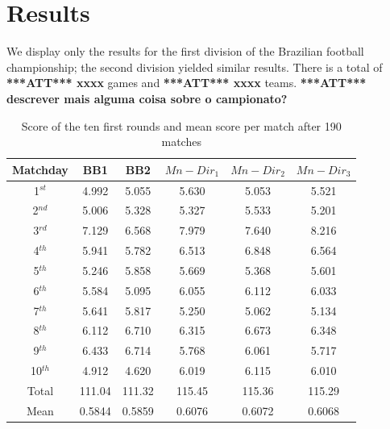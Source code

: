 \documentclass[journal,article,accept,moreauthors,pdftex,12pt,a4paper]{mdpi}
\newcommand{\red}[1]{\textbf{\color{red} ***ATT*** #1}}
\begin{document}
\section{Results}
\label{sec::results}

We display only the results for the first division
of the Brazilian football championship; the second
division yielded similar results.
There is a total of \red{xxxx} games and \red{xxxx}
teams. \red{descrever mais alguma coisa sobre o campionato?}

\begin{table}[H]
\begin{center}
\begin{tabular}{cccccc}

\hline
Matchday & BB1 & BB2 & $Mn-Dir_1$ & $Mn-Dir_2$ & $Mn-Dir_3$\\
\hline
\hline
1$^{st}$ &4.992 & 5.055 & 5.630 & 5.053 & 5.521 \\
2$^{nd}$ &5.006 & 5.328 & 5.327 & 5.533 & 5.201 \\
3$^{rd}$ &7.129 & 6.568 & 7.979 & 7.640 & 8.216 \\
4$^{th}$ &5.941 & 5.782 & 6.513 & 6.848 & 6.564 \\
5$^{th}$ &5.246 & 5.858 & 5.669 & 5.368 & 5.601 \\
6$^{th}$ &5.584 & 5.095 & 6.055 & 6.112 & 6.033 \\
7$^{th}$ &5.641 & 5.817 & 5.250 & 5.062 & 5.134 \\
8$^{th}$ &6.112 & 6.710 & 6.315 & 6.673 & 6.348 \\
9$^{th}$ &6.433 & 6.714 & 5.768 & 6.061 & 5.717 \\
10$^{th}$ &4.912 & 4.620 & 6.019 & 6.115 & 6.010 \\
\hline
Total & 111.04 & 111.32 & 115.45 & 115.36 & 115.29 \\
\hline
Mean & 0.5844 & 0.5859 & 0.6076 & 0.6072 & 0.6068 \\
\hline
\end{tabular}
\caption{Score of the ten first rounds and mean score per match after 190 matches}
\end{center}
\end{table}


\end{document}
